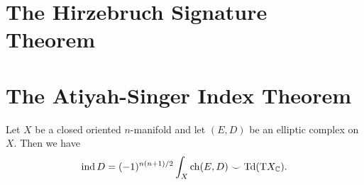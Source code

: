 
\section{The Hirzebruch Signature Theorem}

\begin{theorem}\label{thm:hirzebruch_signature}
\end{theorem}

\section{The Atiyah-Singer Index Theorem}

\begin{theorem}\label{thm:atiyah-singer_index}
  Let $X$ be a closed oriented $n$-manifold and let $(E,D)$ be an elliptic complex on $X$. Then we have
  \[
    \operatorname{\operatorname{ind}} D = (-1)^{n(n+1)/2}\int_X \mathrm{ch}(E,D)\smile \operatorname{\operatorname{Td}}(\mathrm{T} X_{\mathbb{C}}).
  \]
\end{theorem}
